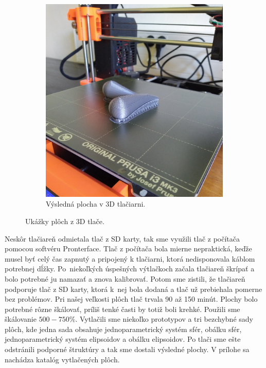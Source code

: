 \begin{figure}[h]
\begin{subfigure}[b]{0.49\textwidth}
     \includegraphics[width=\textwidth]{images/plocha_v_tlaciarni.jpg}
	\caption[Plocha v 3D tlačiarni.]{Výsledná plocha v 3D tlačiarni.}
	\label{fig:plocha_v_tlaciarni}
	\end{subfigure}
	\caption[Ukážky plôch z 3D tlače.]{Ukážky plôch z 3D tlače.}
\end{figure}
Neskôr tlačiareň odmietala tlač z SD karty, tak sme využili tlač z počítača pomocou softvéru Pronterface. Tlač z počítača bola mierne nepraktická, keďže musel byť celý čas zapnutý a pripojený k tlačiarni, ktorá nedisponovala káblom potrebnej dĺžky. Po~niekoľkých úspešných výtlačkoch začala tlačiareň škrípať a bolo potrebné ju namazať a znova kalibrovať. Potom sme zistili, že tlačiareň podporuje tlač z SD karty, ktorá k~nej bola dodaná a tlač už prebiehala pomerne bez problémov. Pri našej veľkosti plôch tlač trvala 90 až 150 minút. Plochy bolo potrebné rôzne škálovať, príliš tenké časti by totiž boli krehké. Použili sme škálovanie $500-750\%$. Vytlačili sme niekoľko prototypov a tri bezchybné sady plôch, kde jedna sada obsahuje jednoparametrický systém sfér, obálku sfér, jednoparametrický systém elipsoidov a obálku elipsoidov. Po tlači sme ešte odstránili podporné štruktúry a tak sme dostali výsledné plochy. V prílohe  sa nachádza katalóg vytlačených plôch.

